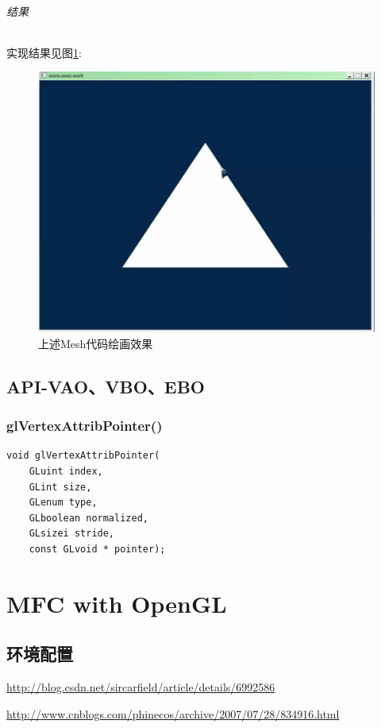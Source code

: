 \documentclass[UTF8,a4paper,12pt]{ctexbook}
\begin{document}
		\subparagraph{结果}
			实现结果见图\ref{VAOResult}:
			\begin{figure}[h]
				\centering
				\includegraphics[scale = 0.5]{VBOMeshResult.png}
				\caption{上述Mesh代码绘画效果}
				\label{VAOResult}
			\end{figure}
	
	
	
	\section{API-VAO、VBO、EBO}
		\subsection{glVertexAttribPointer()}
			\begin{lstlisting}
void glVertexAttribPointer(	
	GLuint index,
 	GLint size,
 	GLenum type,
 	GLboolean normalized,
 	GLsizei stride,
 	const GLvoid * pointer);			
			\end{lstlisting}



\chapter{MFC with OpenGL}
	\section{环境配置}
		\url{http://blog.csdn.net/sircarfield/article/details/6992586}
		
		\url{http://www.cnblogs.com/phinecos/archive/2007/07/28/834916.html}
		
\end{document}
